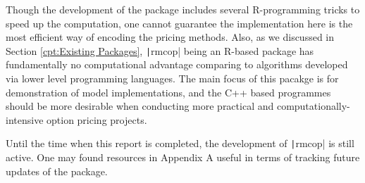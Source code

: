 Though the development of the package includes several R-programming tricks to speed up the computation, one cannot guarantee the implementation here is the most efficient way of encoding the pricing methods. Also, as we discussed in Section \ref{cpt:Existing Packages}, \texttt|rmcop| being an R-based package has fundamentally no computational advantage comparing to algorithms developed via lower level programming languages. The main focus of this pacakge is for demonstration of model implementations, and the C++ based programmes should be more desirable when conducting more practical and computationally-intensive option pricing projects.

Until the time when this report is completed, the development of \texttt|rmcop| is still active. One may found resources in Appendix A useful in terms of tracking future updates of the package.

\newpage